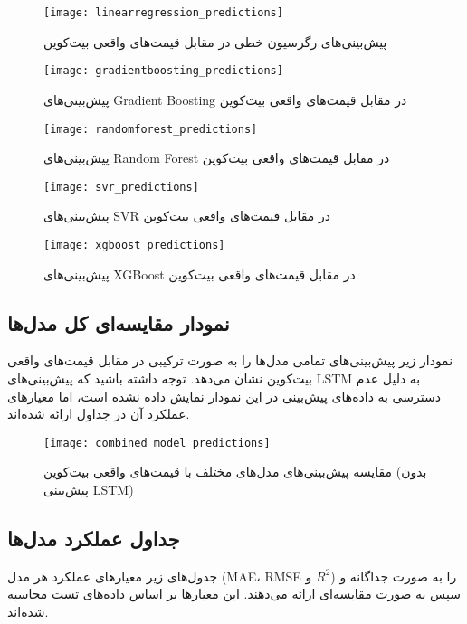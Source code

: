 \begin{figure}[H]
	\centering
	\texttt{[image: linearregression\_predictions]}
	\caption{پیش‌بینی‌های رگرسیون خطی در مقابل قیمت‌های واقعی بیت‌کوین}
	\label{fig:linearregression_predictions}
\end{figure}

\begin{figure}[H]
	\centering
	\texttt{[image: gradientboosting\_predictions]}
	\caption{پیش‌بینی‌های Gradient Boosting در مقابل قیمت‌های واقعی بیت‌کوین}
	\label{fig:gradientboosting_predictions}
\end{figure}

\begin{figure}[H]
	\centering
	\texttt{[image: randomforest\_predictions]}
	\caption{پیش‌بینی‌های Random Forest در مقابل قیمت‌های واقعی بیت‌کوین}
	\label{fig:randomforest_predictions}
\end{figure}

\begin{figure}[H]
	\centering
	\texttt{[image: svr\_predictions]}
	\caption{پیش‌بینی‌های SVR در مقابل قیمت‌های واقعی بیت‌کوین}
	\label{fig:svr_predictions}
\end{figure}

\begin{figure}[H]
	\centering
	\texttt{[image: xgboost\_predictions]}
	\caption{پیش‌بینی‌های XGBoost در مقابل قیمت‌های واقعی بیت‌کوین}
	\label{fig:xgboost_predictions}
\end{figure}



\subsection{نمودار مقایسه‌ای کل مدل‌ها}
نمودار زیر پیش‌بینی‌های تمامی مدل‌ها را به صورت ترکیبی در مقابل قیمت‌های واقعی بیت‌کوین نشان می‌دهد. توجه داشته باشید که پیش‌بینی‌های LSTM به دلیل عدم دسترسی به داده‌های پیش‌بینی در این نمودار نمایش داده نشده است، اما معیارهای عملکرد آن در جداول ارائه شده‌اند.

\begin{figure}[H]
	\centering
	\texttt{[image: combined\_model\_predictions]}
	\caption{مقایسه پیش‌بینی‌های مدل‌های مختلف با قیمت‌های واقعی بیت‌کوین (بدون پیش‌بینی LSTM)}
	\label{fig:combined_model_predictions}
\end{figure}

\subsection{جداول عملکرد مدل‌ها}
جدول‌های زیر معیارهای عملکرد هر مدل (MAE، RMSE و $ R^2 $) را به صورت جداگانه و سپس به صورت مقایسه‌ای ارائه می‌دهند. این معیارها بر اساس داده‌های تست محاسبه شده‌اند.

